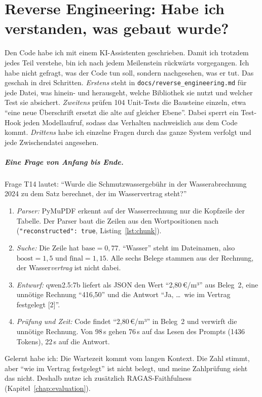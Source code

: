 
\chapter{Reverse Engineering: Habe ich verstanden, was gebaut wurde?}
\label{chap:reverse}

Den Code habe ich mit einem KI-Assistenten geschrieben. Damit ich trotzdem jedes Teil verstehe, bin ich nach jedem Meilenstein rückwärts vorgegangen. Ich habe nicht gefragt, was der Code tun soll, sondern nachgesehen, was er tut. Das geschah in drei Schritten. \emph{Erstens} steht in \texttt{docs/reverse\_engineering.md} für jede Datei, was hinein- und herausgeht, welche Bibliothek sie nutzt und welcher Test sie absichert. \emph{Zweitens} prüfen 104 Unit-Tests die Bausteine einzeln, etwa \enquote{eine neue Überschrift ersetzt die alte auf gleicher Ebene}. Dabei sperrt ein Test-Hook jeden Modellaufruf, sodass das Verhalten nachweislich aus dem Code kommt. \emph{Drittens} habe ich einzelne Fragen durch das ganze System verfolgt und jede Zwischendatei angesehen.

\paragraph{Eine Frage von Anfang bis Ende.} Frage T14 lautet: \enquote{Wurde die Schmutzwassergebühr in der Wasserabrechnung 2024 zu dem Satz berechnet, der im Wasservertrag steht?}
\begin{enumerate}[nosep, leftmargin=*]
    \item \emph{Parser:} PyMuPDF erkennt auf der Wasserrechnung nur die Kopfzeile der Tabelle. Der Parser baut die Zeilen aus den Wortpositionen nach (\texttt{"reconstructed": true}, Listing~\ref{lst:chunk}).
    \item \emph{Suche:} Die Zeile hat $\text{base}=0{,}77$. \enquote{Wasser} steht im Dateinamen, also $\text{boost}=1{,}5$ und $\text{final}=1{,}15$. Alle sechs Belege stammen aus der Rechnung, der Wasser\emph{vertrag} ist nicht dabei.
    \item \emph{Entwurf:} qwen2.5:7b liefert als JSON den Wert \enquote{2,80\,€/m³} aus Beleg~2, eine unnötige Rechnung \enquote{416,50} und die Antwort \enquote{Ja, \dots\ wie im Vertrag festgelegt [2]}.
    \item \emph{Prüfung und Zeit:} Code findet \enquote{2,80\,€/m³} in Beleg~2 und verwirft die unnötige Rechnung. Von 98\,s gehen 76\,s auf das Lesen des Prompts (1436 Tokens), 22\,s auf die Antwort.
\end{enumerate}
Gelernt habe ich: Die Wartezeit kommt vom langen Kontext. Die Zahl stimmt, aber \enquote{wie im Vertrag festgelegt} ist nicht belegt, und meine Zahlprüfung sieht das nicht. Deshalb nutze ich zusätzlich RAGAS-Faithfulness (Kapitel~\ref{chap:evaluation}).

